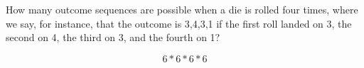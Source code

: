 \item How many outcome sequences are possible when a die is rolled four times, where we say, for instance, that the outcome is 3,4,3,1 if the first roll landed on 3, the second on 4, the third on 3, and the fourth on 1?

\[ 6 * 6 * 6 * 6 \]